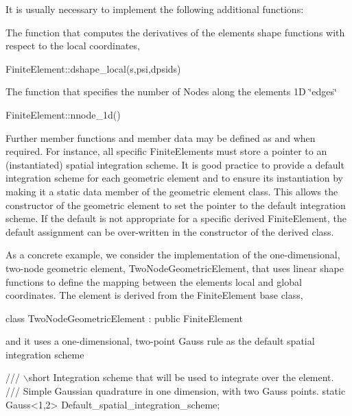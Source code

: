 It is usually necessary to implement the following additional functions\+:
\begin{DoxyItemize}
\item The function that computes the derivatives of the element\textquotesingle{}s shape functions with respect to the local coordinates, 
\begin{DoxyCode}
FiniteElement::dshape\_local(s,psi,dpsids) 
\end{DoxyCode}

\item The function that specifies the number of Nodes along the element\textquotesingle{}s 1D \char`\"{}edges\char`\"{} 
\begin{DoxyCode}
FiniteElement::nnode\_1d() 
\end{DoxyCode}

\end{DoxyItemize}Further member functions and member data may be defined as and when required. For instance, all specific {\ttfamily Finite\+Elements} must store a pointer to an (instantiated) spatial integration scheme. It is good practice to provide a default integration scheme for each geometric element and to ensure its instantiation by making it a static data member of the geometric element class. This allows the constructor of the geometric element to set the pointer to the default integration scheme. If the default is not appropriate for a specific derived {\ttfamily Finite\+Element}, the default assignment can be over-\/written in the constructor of the derived class.

As a concrete example, we consider the implementation of the one-\/dimensional, two-\/node geometric element, {\ttfamily Two\+Node\+Geometric\+Element}, that uses linear shape functions to define the mapping between the element\textquotesingle{}s local and global coordinates. The element is derived from the {\ttfamily Finite\+Element} base class,  
\begin{DoxyCodeInclude}
\textcolor{keyword}{class }TwoNodeGeometricElement : \textcolor{keyword}{public} FiniteElement

\end{DoxyCodeInclude}


and it uses a one-\/dimensional, two-\/point Gauss rule as the default spatial integration scheme 
\begin{DoxyCodeInclude}
 \textcolor{comment}{/// \(\backslash\)short Integration scheme that will be used to integrate over the element.}
\textcolor{comment}{ /// Simple Gaussian quadrature in one dimension, with two Gauss points.}
\textcolor{comment}{} \textcolor{keyword}{static} Gauss<1,2> Default\_spatial\_integration\_scheme;

\end{DoxyCodeInclude}


